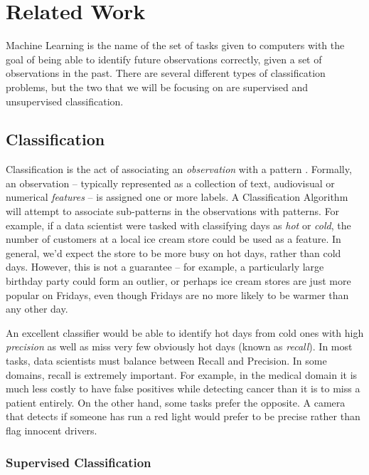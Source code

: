\chapter{Related Work}\label{sec:related}

Machine Learning is the name of the set of tasks given to computers with the goal of being able to identify future observations correctly, given a set of observations in the past. There are several different types of classification problems, but the two that we will be focusing on are supervised and unsupervised classification. 

\section{Classification}

Classification is the act of associating an \textit{observation} with a pattern \cite{liu2007web}. Formally, an observation -- typically represented as a collection of text, audiovisual or numerical \textit{features} -- is assigned one or more labels. A Classification Algorithm will attempt to associate sub-patterns in the observations with patterns. For example, if a data scientist were tasked with classifying days as \textit{hot} or \textit{cold}, the number of customers at a local ice cream store could be used as a feature. In general, we'd expect the store to be more busy on hot days, rather than cold days. However, this is not a guarantee -- for example, a particularly large birthday party could form an outlier, or perhaps ice cream stores are just more popular on Fridays, even though Fridays are no more likely to be warmer than any other day. 

An excellent classifier would be able to identify hot days from cold ones with high \textit{precision} as well as miss very few obviously hot days (known as \textit{recall}). In most tasks, data scientists must balance between Recall and Precision. In some domains, recall is extremely important. For example, in the medical domain it is much less costly to have false positives while detecting cancer than it is to miss a patient entirely. On the other hand, some tasks prefer the opposite. A camera that detects if someone has run a red light would prefer to be precise rather than flag innocent drivers.

\subsection{Supervised Classification}


